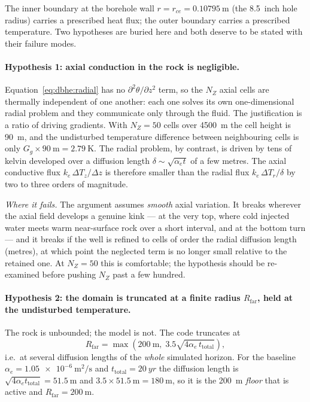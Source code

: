 The inner boundary at the borehole wall $r=r_{ce}=\SI{0.10795}{\metre}$ (the
\SI{8.5}{inch} hole radius) carries a prescribed heat flux; the outer boundary
carries a prescribed temperature. Two hypotheses are buried here and both
deserve to be stated with their failure modes.

\paragraph{Hypothesis 1: axial conduction in the rock is negligible.}
Equation~\eqref{eq:dbhe:radial} has no $\partial^2\theta/\partial z^2$ term, so
the $N_Z$ axial cells are thermally independent of one another: each one solves
its own one-dimensional radial problem and they communicate only through the
fluid. The justification is a ratio of driving gradients. With $N_Z=50$ cells
over \SI{4500}{\metre} the cell height is \SI{90}{\metre}, and the undisturbed
temperature difference between neighbouring cells is only
$G_g\times\SI{90}{\metre}=\SI{2.79}{\kelvin}$. The radial problem, by contrast,
is driven by tens of kelvin developed over a diffusion length
$\delta\sim\sqrt{\alpha_e t}$ of a few metres. The axial conductive flux
$k_e\,\Delta T_z/\Delta z$ is therefore smaller than the radial flux
$k_e\,\Delta T_r/\delta$ by two to three orders of magnitude.

\emph{Where it fails.} The argument assumes \emph{smooth} axial variation. It
breaks wherever the axial field develops a genuine kink --- at the very top,
where cold injected water meets warm near-surface rock over a short interval,
and at the bottom turn --- and it breaks if the well is refined to cells of order
the radial diffusion length (metres), at which point the neglected term is no
longer small relative to the retained one. At $N_Z=50$ this is comfortable; the
hypothesis should be re-examined before pushing $N_Z$ past a few hundred.

\paragraph{Hypothesis 2: the domain is truncated at a finite radius
$R_{\mathrm{far}}$, held at the undisturbed temperature.}
The rock is unbounded; the model is not. The code truncates at
\begin{equation}
R_{\mathrm{far}}=\max\!\left(\SI{200}{\metre},\;
3.5\sqrt{4\alpha_e\,t_{\mathrm{total}}}\right),
\label{eq:dbhe:Rfar}
\end{equation}
i.e.\ at several diffusion lengths of the \emph{whole} simulated horizon. For
the baseline $\alpha_e=\SI{1.05e-6}{\metre\squared\per\second}$ and
$t_{\mathrm{total}}=\SI{20}{yr}$ the diffusion length is
$\sqrt{4\alpha_e t_{\mathrm{total}}}=\SI{51.5}{\metre}$ and
$3.5\times\SI{51.5}{\metre}=\SI{180}{\metre}$, so it is the
\SI{200}{\metre} \emph{floor} that is active and $R_{\mathrm{far}}=\SI{200}{\metre}$.

